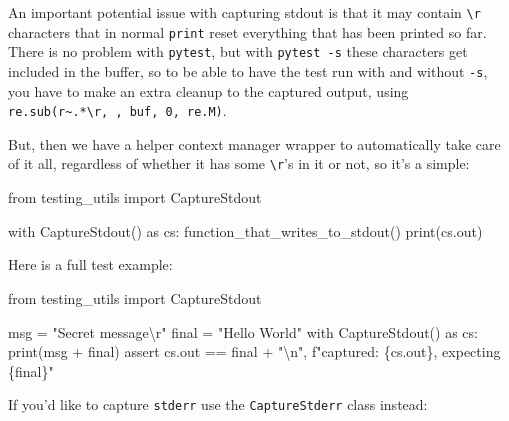 \documentclass[
]{report}
\newenvironment{Shaded}{\begin{snugshade}}{\end{snugshade}}
\newcommand{\BuiltInTok}[1]{\textcolor[rgb]{0.00,0.23,0.31}{#1}}
\newcommand{\CharTok}[1]{\textcolor[rgb]{0.13,0.47,0.30}{#1}}
\newcommand{\ControlFlowTok}[1]{\textcolor[rgb]{0.00,0.23,0.31}{#1}}
\newcommand{\ImportTok}[1]{\textcolor[rgb]{0.00,0.46,0.62}{#1}}
\newcommand{\NormalTok}[1]{\textcolor[rgb]{0.00,0.23,0.31}{#1}}
\newcommand{\OperatorTok}[1]{\textcolor[rgb]{0.37,0.37,0.37}{#1}}
\newcommand{\SpecialCharTok}[1]{\textcolor[rgb]{0.37,0.37,0.37}{#1}}
\newcommand{\SpecialStringTok}[1]{\textcolor[rgb]{0.13,0.47,0.30}{#1}}
\newcommand{\StringTok}[1]{\textcolor[rgb]{0.13,0.47,0.30}{#1}}
\begin{document}
An important potential issue with capturing stdout is that it may
contain \texttt{\textbackslash{}r} characters that in normal
\texttt{print} reset everything that has been printed so far. There is
no problem with \texttt{pytest}, but with \texttt{pytest\ -s} these
characters get included in the buffer, so to be able to have the test
run with and without \texttt{-s}, you have to make an extra cleanup to
the captured output, using
\texttt{re.sub(r\textquotesingle{}\textasciitilde{}.*\textbackslash{}r\textquotesingle{},\ \textquotesingle{}\textquotesingle{},\ buf,\ 0,\ re.M)}.

But, then we have a helper context manager wrapper to automatically take
care of it all, regardless of whether it has some
\texttt{\textbackslash{}r}'s in it or not, so it's a simple:

\begin{Shaded}
\begin{Highlighting}[]
\ImportTok{from}\NormalTok{ testing\_utils }\ImportTok{import}\NormalTok{ CaptureStdout}

\ControlFlowTok{with}\NormalTok{ CaptureStdout() }\ImportTok{as}\NormalTok{ cs:}
\NormalTok{    function\_that\_writes\_to\_stdout()}
\BuiltInTok{print}\NormalTok{(cs.out)}
\end{Highlighting}
\end{Shaded}

Here is a full test example:

\begin{Shaded}
\begin{Highlighting}[]
\ImportTok{from}\NormalTok{ testing\_utils }\ImportTok{import}\NormalTok{ CaptureStdout}

\NormalTok{msg }\OperatorTok{=} \StringTok{"Secret message}\CharTok{\textbackslash{}r}\StringTok{"}
\NormalTok{final }\OperatorTok{=} \StringTok{"Hello World"}
\ControlFlowTok{with}\NormalTok{ CaptureStdout() }\ImportTok{as}\NormalTok{ cs:}
    \BuiltInTok{print}\NormalTok{(msg }\OperatorTok{+}\NormalTok{ final)}
\ControlFlowTok{assert}\NormalTok{ cs.out }\OperatorTok{==}\NormalTok{ final }\OperatorTok{+} \StringTok{"}\CharTok{\textbackslash{}n}\StringTok{"}\NormalTok{, }\SpecialStringTok{f"captured: }\SpecialCharTok{\{}\NormalTok{cs}\SpecialCharTok{.}\NormalTok{out}\SpecialCharTok{\}}\SpecialStringTok{, expecting }\SpecialCharTok{\{}\NormalTok{final}\SpecialCharTok{\}}\SpecialStringTok{"}
\end{Highlighting}
\end{Shaded}

If you'd like to capture \texttt{stderr} use the \texttt{CaptureStderr}
class instead:
\end{document}
